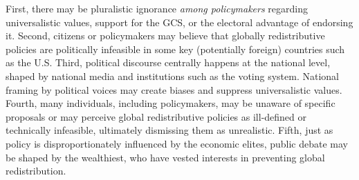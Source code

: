 First, there may be pluralistic ignorance \textit{among policymakers} regarding universalistic values, support for the GCS, or the electoral advantage of endorsing it. 
Second, citizens or policymakers may believe that globally redistributive policies are politically infeasible in some key (potentially foreign) countries such as the U.S. %
Third, political discourse centrally happens at the national level, shaped by national media and institutions such as the voting system. 
National framing by political voices may create biases and suppress universalistic values. %
Fourth, many individuals, including policymakers, may be unaware of specific proposals or may perceive global redistributive policies as ill-defined or technically infeasible, %
ultimately dismissing them as unrealistic. %
Fifth, just as policy is disproportionately influenced by the economic elites,\citep{mccright_defeating_2003,gilens_testing_2014,persson_rich_2023} public debate may be shaped by the wealthiest, who have vested interests in preventing global redistribution.

